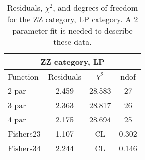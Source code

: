 \begin{table}[htb]
\centering
\begin{tabular}{|l c c c |}
\hline
\multicolumn{4}{|c|}{ZZ category, LP}\\
\hline
Function & Residuals & $\chi^2$ & ndof \\
\hline
2 par & 2.459 & 28.583 & 27 \\
3 par & 2.363 & 28.817 & 26 \\
4 par & 2.175 & 28.694 & 25 \\
\hline
\hline
Fishers23  & 1.107 & CL &0.302\\
Fishers34  & 2.244 & CL &0.146\\
\hline
\end{tabular}
\caption{Residuals, $\chi^{2}$, and degrees of freedom for the ZZ category, LP category. A 2 parameter fit is needed to describe these data.}
\label{tab:ZZ category, LP}
\end{table}
